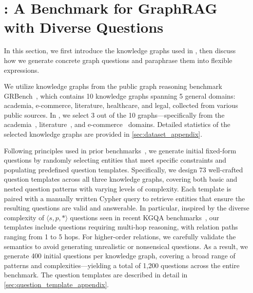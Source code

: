 \section{\benchmarkname: A Benchmark for GraphRAG with Diverse Questions}\label{sec:benchmark}

In this section, we first introduce the knowledge graphs used in \benchmarkname, then discuss how we generate concrete graph questions and paraphrase them into flexible expressions.


 We utilize knowledge graphs from the public graph reasoning benchmark GRBench~\cite{graphcot}, which contains 10 knowledge graphs spanning 5 general domains: academia, e-commerce, literature, healthcare, and legal, collected from various public sources. In \benchmarkname{}, we select 3 out of the 10 graphs—specifically from the academia~\cite{academia}, literature~\cite{literature}, and e-commerce~\cite{e-commerce} domains. Detailed statistics of the selected knowledge graphs are provided in \autoref{sec:dataset_appendix}.

 Following principles used in prior benchmarks~\cite{cwq, graphcot, grailqa, cypherbench}, we generate initial fixed-form questions by randomly selecting entities that meet specific constraints and populating predefined question templates. Specifically, we design 73 well-crafted question templates across all three knowledge graphs, covering both basic and nested question patterns with varying levels of complexity. Each template is paired with a manually written Cypher query to retrieve entities that ensure the resulting questions are valid and answerable. In particular, inspired by the diverse complexity of $\langle s, p, * \rangle$ questions seen in recent KGQA benchmarks~\cite{cwq, graphq, grailqa, graphcot}, our templates include questions requiring multi-hop reasoning, with relation paths ranging from 1 to 5 hops. For higher-order relations, we carefully validate the semantics to avoid generating unrealistic or nonsensical questions. As a result, we generate 400 initial questions per knowledge graph, covering a broad range of patterns and complexities—yielding a total of 1,200 questions across the entire benchmark. The question templates are described in detail in \autoref{sec:question_template_appendix}.


